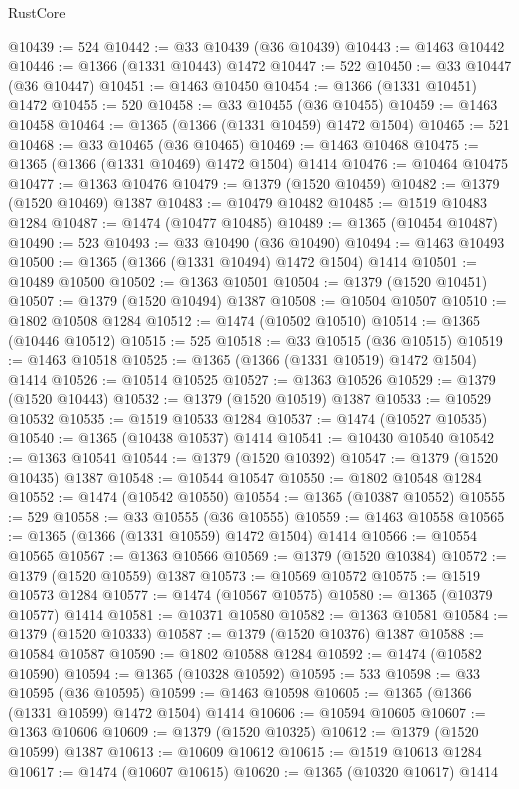 \begin{lexlean}{RustCore}
\begin{coremodule}
@10439 := 524
@10442 := @33 @10439 (@36 @10439)
@10443 := @1463 @10442
@10446 := @1366 (@1331 @10443) @1472
@10447 := 522
@10450 := @33 @10447 (@36 @10447)
@10451 := @1463 @10450
@10454 := @1366 (@1331 @10451) @1472
@10455 := 520
@10458 := @33 @10455 (@36 @10455)
@10459 := @1463 @10458
@10464 := @1365 (@1366 (@1331 @10459) @1472 @1504)
@10465 := 521
@10468 := @33 @10465 (@36 @10465)
@10469 := @1463 @10468
@10475 := @1365 (@1366 (@1331 @10469) @1472 @1504) @1414
@10476 := @10464 @10475
@10477 := @1363 @10476
@10479 := @1379 (@1520 @10459)
@10482 := @1379 (@1520 @10469) @1387
@10483 := @10479 @10482
@10485 := @1519 @10483 @1284
@10487 := @1474 (@10477 @10485)
@10489 := @1365 (@10454 @10487)
@10490 := 523
@10493 := @33 @10490 (@36 @10490)
@10494 := @1463 @10493
@10500 := @1365 (@1366 (@1331 @10494) @1472 @1504) @1414
@10501 := @10489 @10500
@10502 := @1363 @10501
@10504 := @1379 (@1520 @10451)
@10507 := @1379 (@1520 @10494) @1387
@10508 := @10504 @10507
@10510 := @1802 @10508 @1284
@10512 := @1474 (@10502 @10510)
@10514 := @1365 (@10446 @10512)
@10515 := 525
@10518 := @33 @10515 (@36 @10515)
@10519 := @1463 @10518
@10525 := @1365 (@1366 (@1331 @10519) @1472 @1504) @1414
@10526 := @10514 @10525
@10527 := @1363 @10526
@10529 := @1379 (@1520 @10443)
@10532 := @1379 (@1520 @10519) @1387
@10533 := @10529 @10532
@10535 := @1519 @10533 @1284
@10537 := @1474 (@10527 @10535)
@10540 := @1365 (@10438 @10537) @1414
@10541 := @10430 @10540
@10542 := @1363 @10541
@10544 := @1379 (@1520 @10392)
@10547 := @1379 (@1520 @10435) @1387
@10548 := @10544 @10547
@10550 := @1802 @10548 @1284
@10552 := @1474 (@10542 @10550)
@10554 := @1365 (@10387 @10552)
@10555 := 529
@10558 := @33 @10555 (@36 @10555)
@10559 := @1463 @10558
@10565 := @1365 (@1366 (@1331 @10559) @1472 @1504) @1414
@10566 := @10554 @10565
@10567 := @1363 @10566
@10569 := @1379 (@1520 @10384)
@10572 := @1379 (@1520 @10559) @1387
@10573 := @10569 @10572
@10575 := @1519 @10573 @1284
@10577 := @1474 (@10567 @10575)
@10580 := @1365 (@10379 @10577) @1414
@10581 := @10371 @10580
@10582 := @1363 @10581
@10584 := @1379 (@1520 @10333)
@10587 := @1379 (@1520 @10376) @1387
@10588 := @10584 @10587
@10590 := @1802 @10588 @1284
@10592 := @1474 (@10582 @10590)
@10594 := @1365 (@10328 @10592)
@10595 := 533
@10598 := @33 @10595 (@36 @10595)
@10599 := @1463 @10598
@10605 := @1365 (@1366 (@1331 @10599) @1472 @1504) @1414
@10606 := @10594 @10605
@10607 := @1363 @10606
@10609 := @1379 (@1520 @10325)
@10612 := @1379 (@1520 @10599) @1387
@10613 := @10609 @10612
@10615 := @1519 @10613 @1284
@10617 := @1474 (@10607 @10615)
@10620 := @1365 (@10320 @10617) @1414

\end{coremodule}
\end{lexlean}
